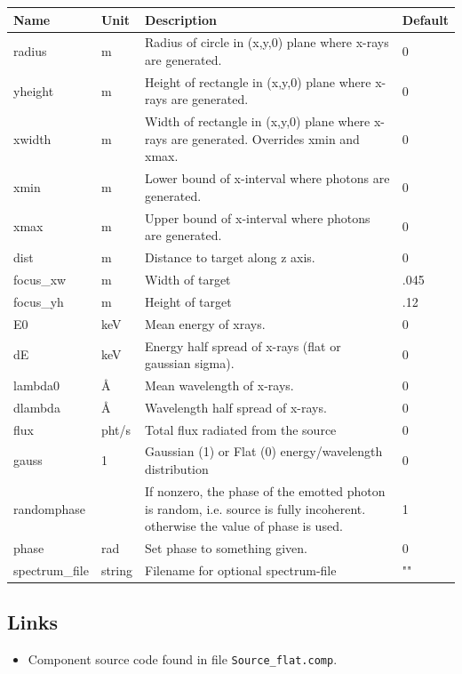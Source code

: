\begin{longtable}{p{}p{}p{}p{}}
\toprule
\textbf{Name} & \textbf{Unit} & \textbf{Description} & \textbf{Default} \\
\midrule
\endhead
radius & m & Radius of circle in (x,y,0) plane where x-rays are generated. & 0 \\
yheight & m & Height of rectangle in (x,y,0) plane where x-rays are generated. & 0 \\
xwidth & m & Width of rectangle in (x,y,0) plane where x-rays are generated. Overrides xmin and xmax. & 0 \\
xmin & m & Lower bound of x-interval where photons are generated. & 0 \\
xmax & m & Upper bound of x-interval where photons are generated. & 0 \\
dist & m & Distance to target along z axis. & 0 \\
focus\_xw & m & Width of target & .045 \\
focus\_yh & m & Height of target & .12 \\
E0 & keV & Mean energy of xrays. & 0 \\
dE & keV & Energy half spread of x-rays (flat or gaussian sigma). & 0 \\
lambda0 & \AA{} & Mean wavelength of x-rays. & 0 \\
dlambda & \AA{} & Wavelength half spread of x-rays. & 0 \\
flux & pht/s & Total flux radiated from the source & 0 \\
gauss & 1 & Gaussian (1) or Flat (0) energy/wavelength distribution & 0 \\
randomphase &   & If nonzero, the phase of the emotted photon is random, i.e. source is fully incoherent. otherwise the value of phase is used. & 1 \\
phase & rad & Set phase to something given. & 0 \\
spectrum\_file & string & Filename for optional spectrum-file & "" \\
\bottomrule
\end{longtable}

\subsection*{Links}
\begin{itemize}
  \item Component source code found in file \texttt{Source\_flat.comp}.
\end{itemize}
